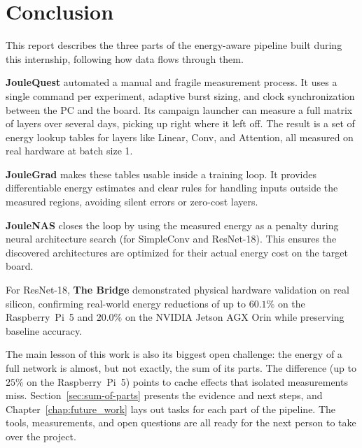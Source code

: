 \chapter{Conclusion}

This report describes the three parts of the energy-aware pipeline built during this internship, following how data flows through them.

\textbf{JouleQuest} automated a manual and fragile measurement process. It uses a single command per experiment, adaptive burst sizing, and clock synchronization between the PC and the board. Its campaign launcher can measure a full matrix of layers over several days, picking up right where it left off. The result is a set of energy lookup tables for layers like Linear, Conv, and Attention, all measured on real hardware at batch size 1.

\textbf{JouleGrad} makes these tables usable inside a training loop. It provides differentiable energy estimates and clear rules for handling inputs outside the measured regions, avoiding silent errors or zero-cost layers.

\textbf{JouleNAS} closes the loop by using the measured energy as a penalty during neural architecture search (for SimpleConv and ResNet-18). This ensures the discovered architectures are optimized for their actual energy cost on the target board.

For ResNet-18, \textbf{The Bridge} demonstrated physical hardware validation on real silicon, confirming real-world energy reductions of up to $60.1\%$ on the Raspberry~Pi~5 and $20.0\%$ on the NVIDIA Jetson AGX Orin while preserving baseline accuracy.

The main lesson of this work is also its biggest open challenge: the energy of a full network is almost, but not exactly, the sum of its parts. The difference (up to $25\%$ on the Raspberry~Pi~5) points to cache effects that isolated measurements miss. Section~\ref{sec:sum-of-parts} presents the evidence and next steps, and Chapter~\ref{chap:future_work} lays out tasks for each part of the pipeline. The tools, measurements, and open questions are all ready for the next person to take over the project.
